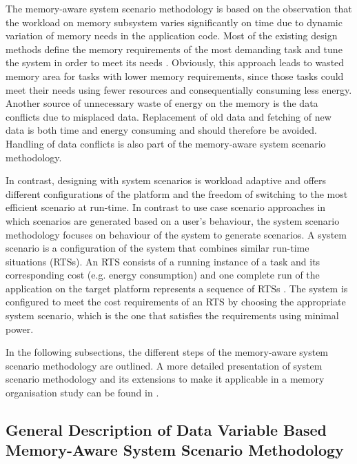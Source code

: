 \documentclass[a4paper,conference]{IEEEtran}
\begin{document}
The memory-aware system scenario methodology is based on the observation that the workload on memory subsystem varies significantly on time due to dynamic variation of memory needs in the application code. Most of the existing design methods define the memory requirements of the most demanding task and tune the system in order to meet its needs \cite{tcm}. Obviously, this approach leads to wasted memory area for tasks with lower memory requirements, since those tasks could meet their needs using fewer resources and consequentially consuming less energy. Another source of unnecessary waste of energy on the memory is the data conflicts due to misplaced data. Replacement of old data and fetching of new data is both time and energy consuming and should therefore be avoided. Handling of data conflicts is also part of the  memory-aware system scenario methodology.

In contrast, designing with system scenarios is workload adaptive and offers different configurations of the platform and the freedom of switching to the most efficient scenario at run-time. In contrast to use case scenario approaches in which scenarios are generated based on a user's behaviour, the system scenario methodology focuses on behaviour of the system to generate scenarios. A system scenario is a configuration of the system that combines similar run-time situations (RTSs). An RTS consists of a running instance of a task and its corresponding cost (e.g. energy consumption) and one complete run of the application on the target platform represents a sequence of RTSs \cite{Elena2010}. The system is configured to meet the cost requirements of an RTS by choosing the appropriate system scenario, which is the one that satisfies the requirements using minimal power.

In the following subsections, the different steps of the memory-aware system scenario methodology are outlined. A more detailed presentation of system scenario methodology and its extensions to make it applicable in a memory organisation study can be found in \cite{Fil12}.

\subsection{General Description of Data Variable Based Memory-Aware System Scenario Methodology}
\end{document}
